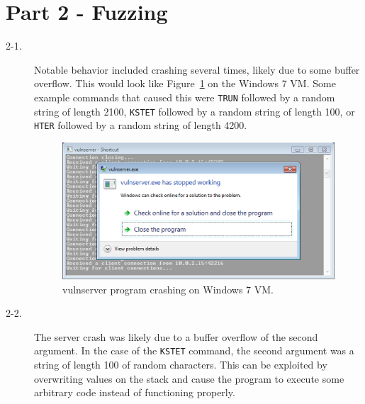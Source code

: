 \documentclass[11pt]{article}
\begin{document}
\section*{Part 2 - Fuzzing}
\begin{description}
  \item[2-1.] Notable behavior included crashing several times, likely due to some buffer overflow. This would look like
    Figure~\ref{fig:crash} on the Windows 7 VM. Some example commands that caused this were \verb|TRUN| followed by a random
    string of length 2100, \verb|KSTET| followed by a random string of length 100, or \verb|HTER| followed by a random string
    of length 4200.
    \begin{figure}[htbp]
      \centering
      \includegraphics[width=1\linewidth]{./crash.png}
      \caption{vulnserver program crashing on Windows 7 VM.}
      \label{fig:crash}
    \end{figure}
  \item[2-2.] The server crash was likely due to a buffer overflow of the second argument. In the case of the \verb|KSTET|
    command, the second argument was a string of length 100 of random characters. This can be exploited by overwriting values
    on the stack and cause the program to execute some arbitrary code instead of functioning properly.
\end{description}
\end{document}
